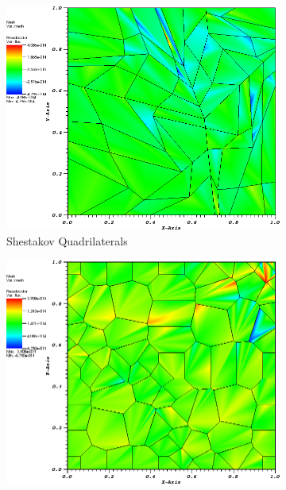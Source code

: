 \begin{figure}
{\begin{subfigure}[b]{0.465\textwidth}
	\end{subfigure}
}
\vspace{3mm}
{
	\begin{subfigure}[b]{0.465\textwidth}
		\centering
		\label{subfig::shes_quad_me_k2_lin_sol}
		\includegraphics[width=\textwidth]{figures/sec_BF/quad_err_shesquad_MV2.png}
		\caption{Shestakov Quadrilaterals}
	\end{subfigure}
	\hfill
	\begin{subfigure}[b]{0.465\textwidth}
		\centering
		\label{subfig::smooth_poly_me_k2_lin_sol}
		\includegraphics[width=\textwidth]{figures/sec_BF/quad_err_sinepoly_MV2.png}

\end{subfigure}}
\end{figure}
